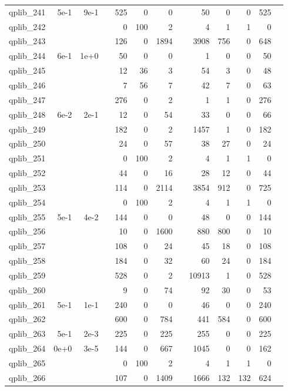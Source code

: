 \begin{table}
\begin{tabular}{lrrrrrrrrrrrr}
				qplib\_241	&	5e-1	&	9e-1	&	&	525	&	0	&	0	&	&	50	&	0	&	0	&	525	\\
qplib\_242	&		&		&	&	0	&	100	&	2	&	&	4	&	1	&	1	&	0	\\
qplib\_243	&		&		&	&	126	&	0	&	1894	&	&	3908	&	756	&	0	&	648	\\
qplib\_244	&	6e-1	&	1e+0	&	&	50	&	0	&	0	&	&	1	&	0	&	0	&	50	\\
qplib\_245	&		&		&	&	12	&	36	&	3	&	&	54	&	3	&	0	&	48	\\
qplib\_246	&		&		&	&	7	&	56	&	7	&	&	42	&	7	&	0	&	63	\\
qplib\_247	&		&		&	&	276	&	0	&	2	&	&	1	&	1	&	0	&	276	\\
qplib\_248	&	6e-2	&	2e-1	&	&	12	&	0	&	54	&	&	33	&	0	&	0	&	66	\\
qplib\_249	&		&		&	&	182	&	0	&	2	&	&	1457	&	1	&	0	&	182	\\
qplib\_250	&		&		&	&	24	&	0	&	57	&	&	38	&	27	&	0	&	24	\\
qplib\_251	&		&		&	&	0	&	100	&	2	&	&	4	&	1	&	1	&	0	\\
qplib\_252	&		&		&	&	44	&	0	&	16	&	&	28	&	12	&	0	&	44	\\
qplib\_253	&		&		&	&	114	&	0	&	2114	&	&	3854	&	912	&	0	&	725	\\
qplib\_254	&		&		&	&	0	&	100	&	2	&	&	4	&	1	&	1	&	0	\\
qplib\_255	&	5e-1	&	4e-2	&	&	144	&	0	&	0	&	&	48	&	0	&	0	&	144	\\
qplib\_256	&		&		&	&	10	&	0	&	1600	&	&	880	&	800	&	0	&	10	\\
qplib\_257	&		&		&	&	108	&	0	&	24	&	&	45	&	18	&	0	&	108	\\
qplib\_258	&		&		&	&	184	&	0	&	32	&	&	60	&	24	&	0	&	184	\\
qplib\_259	&		&		&	&	528	&	0	&	2	&	&	10913	&	1	&	0	&	528	\\
qplib\_260	&		&		&	&	9	&	0	&	74	&	&	92	&	30	&	0	&	53	\\
qplib\_261	&	5e-1	&	1e-1	&	&	240	&	0	&	0	&	&	46	&	0	&	0	&	240	\\
qplib\_262	&		&		&	&	600	&	0	&	784	&	&	441	&	584	&	0	&	600	\\
qplib\_263	&	5e-1	&	2e-3	&	&	225	&	0	&	225	&	&	255	&	0	&	0	&	225	\\
qplib\_264	&	0e+0	&	3e-5	&	&	144	&	0	&	667	&	&	1045	&	0	&	0	&	162	\\
qplib\_265	&		&		&	&	0	&	100	&	2	&	&	4	&	1	&	1	&	0	\\
qplib\_266	&		&		&	&	107	&	0	&	1409	&	&	1666	&	132	&	132	&	624	\\

\end{tabular}
\end{table}
